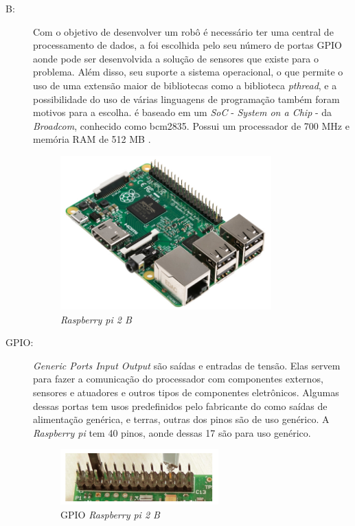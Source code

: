 \begin{description}
\item[ B:] Com o objetivo de desenvolver um robô é necessário ter uma
central de processamento de dados, a \rasp  foi escolhida pelo seu número de
portas GPIO aonde pode ser desenvolvida a solução de sensores que existe
para o problema. Além disso, seu suporte a sistema operacional, o que permite
o uso de uma extensão maior de bibliotecas como a biblioteca \textit{pthread},
e a possibilidade do uso de várias linguagens de programação também foram motivos
para a escolha. \rasp é baseado em um \textit{SoC} - \textit{System on a Chip} -
da \textit{Broadcom}, conhecido como \textsf{bcm2835}. Possui um processador
de 700 MHz e memória RAM de 512 MB \cite{raspfoundation2014}.
\par
\begin{figure}[h]
  \centering
  \includegraphics[width=0.8\textwidth]{figures/rpi2b.jpg}
  \caption{\textit{Raspberry pi 2 B} \cite{raspfoundation2016}}
  \label{fig:raspberry2b}
\end{figure}
\FloatBarrier

\item[GPIO:] \textit{Generic Ports Input Output} são saídas e entradas de tensão.
Elas servem para fazer a comunicação do processador com componentes externos,
sensores e atuadores e outros tipos de componentes eletrônicos. Algumas dessas
portas tem usos predefinidos pelo fabricante do \hardware como saídas de
alimentação genérica, e terras, outras dos pinos são de uso genérico. A
\textit{Raspberry pi} tem 40 pinos, aonde dessas 17 são para uso genérico.
\par
\begin{figure}[h]
  \centering
  \includegraphics[width=0.6\textwidth]{figures/gpio.png}
  \caption{GPIO \textit{Raspberry pi 2 B} \cite{raspfoundationgpio2016}}
  \label{fig:raspberry2b}
\end{figure}
\FloatBarrier


\end{description}
